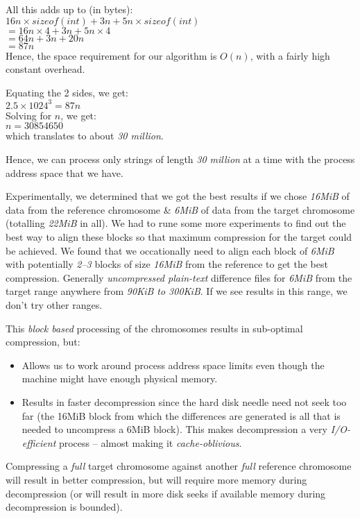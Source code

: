 \documentclass[11pt]{article}
\begin{document}
All this adds up to (in bytes):\\
$16n \times sizeof(int) + 3n + 5n \times sizeof(int)$\\
$= 16n \times 4 + 3n + 5n \times 4$\\
$= 64n + 3n + 20n$\\
$= 87n$\\

Hence, the space requirement for our algorithm is $O(n)$, with a
fairly high constant overhead.

Equating the 2 sides, we get:\\
$2.5 \times 1024^3 = 87n$\\
Solving for $n$, we get:\\
$n = 30854650$\\
which translates to about \textit{30 million}.

Hence, we can process only strings of length \textit{30 million} at a
time with the process address space that we have.

Experimentally, we determined that we got the best results if we chose
\textit{16MiB} of data from the reference chromosome \& \textit{6MiB}
of data from the target chromosome (totalling \textit{22MiB} in
all). We had to rune some more experiments to find out the best way to
align these blocks so that maximum compression for the target could be
achieved. We found that we occationally need to align each block of
\textit{6MiB} with potentially \textit{2--3} blocks of size
\textit{16MiB} from the reference to get the best
compression. Generally \textit{uncompressed plain-text} difference
files for \textit{6MiB} from the target range anywhere from
{\textit{90KiB to 300KiB}}. If we see results in this range, we don't
try other ranges.

This \textit{block based} processing of the chromosomes results in
sub-optimal compression, but:
\begin{itemize}
\item Allows us to work around process address space limits even
  though the machine might have enough physical memory.
\item Results in faster decompression since the hard disk needle need
  not seek too far (the 16MiB block from which the differences are
  generated is all that is needed to uncompress a 6MiB block). This
  makes decompression a very \textit{I/O-efficient} process -- almost
  making it \textit{cache-oblivious}.
\end{itemize}

Compressing a \textit{full} target chromosome against another
\textit{full} reference chromosome will result in better compression,
but will require more memory during decompression (or will result in
more disk seeks if available memory during decompression is bounded).
\end{document}
